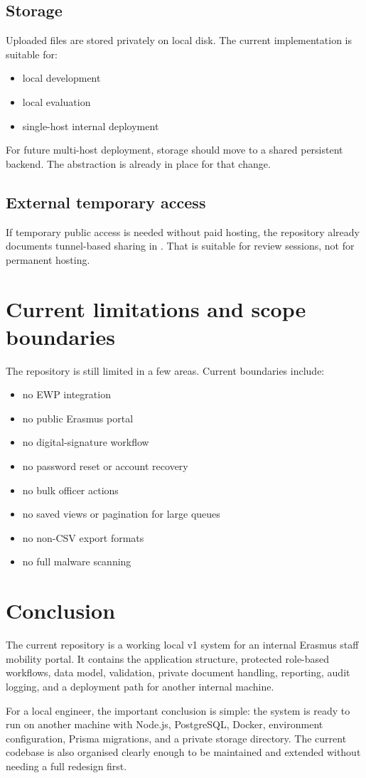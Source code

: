 \documentclass[11pt,a4paper]{article}
\newcommand{\code}[1]{{\small\path{#1}}}
\begin{document}
\subsection{Storage}
Uploaded files are stored privately on local disk. The current implementation is suitable for:

\begin{itemize}
  \item local development
  \item local evaluation
  \item single-host internal deployment
\end{itemize}

For future multi-host deployment, storage should move to a shared persistent backend. The abstraction is already in place for that change.

\subsection{External temporary access}
If temporary public access is needed without paid hosting, the repository already documents tunnel-based sharing in \code{docs/external-sharing.md}. That is suitable for review sessions, not for permanent hosting.

\section{Current limitations and scope boundaries}
The repository is still limited in a few areas. Current boundaries include:

\begin{itemize}
  \item no EWP integration
  \item no public Erasmus portal
  \item no digital-signature workflow
  \item no password reset or account recovery
  \item no bulk officer actions
  \item no saved views or pagination for large queues
  \item no non-CSV export formats
  \item no full malware scanning
\end{itemize}

\section{Conclusion}
The current repository is a working local v1 system for an internal Erasmus staff mobility portal. It contains the application structure, protected role-based workflows, data model, validation, private document handling, reporting, audit logging, and a deployment path for another internal machine.

For a local engineer, the important conclusion is simple: the system is ready to run on another machine with Node.js, PostgreSQL, Docker, environment configuration, Prisma migrations, and a private storage directory. The current codebase is also organised clearly enough to be maintained and extended without needing a full redesign first.
\end{document}
